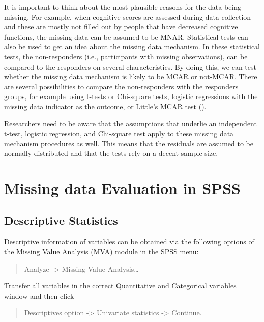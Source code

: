 \documentclass[
]{book}
\begin{document}
It is important to think about the most plausible reasons for the data being missing. For example, when cognitive scores are assessed during data collection and these are mostly not filled out by people that have decreased cognitive functions, the missing data can be assumed to be MNAR. Statistical tests can also be used to get an idea about the missing data mechanism. In these statistical tests, the non-responders (i.e., participants with missing observations), can be compared to the responders on several characteristics. By doing this, we can test whether the missing data mechanism is likely to be MCAR or not-MCAR. There are several possibilities to compare the non-responders with the responders groups, for example using t-tests or Chi-square tests, logistic regressions with the missing data indicator as the outcome, or Little's MCAR test (\citet{Little1988}).

Researchers need to be aware that the assumptions that underlie an independent t-test, logistic regression, and Chi-square test apply to these missing data mechanism procedures as well. This means that the residuals are assumed to be normally distributed and that the tests rely on a decent sample size.

\hypertarget{missing-data-evaluation-in-spss}{%
\section{Missing data Evaluation in SPSS}\label{missing-data-evaluation-in-spss}}

\hypertarget{descriptive-statistics}{%
\subsection{Descriptive Statistics}\label{descriptive-statistics}}

Descriptive information of variables can be obtained via the following options of the Missing Value Analysis (MVA) module in the SPSS menu:

\begin{quote}
Analyze -\textgreater{} Missing Value Analysis\ldots{}
\end{quote}

Transfer all variables in the correct Quantitative and Categorical variables window and then click

\begin{quote}
Descriptives option -\textgreater{} Univariate statistics -\textgreater{} Continue.
\end{quote}
\end{document}
